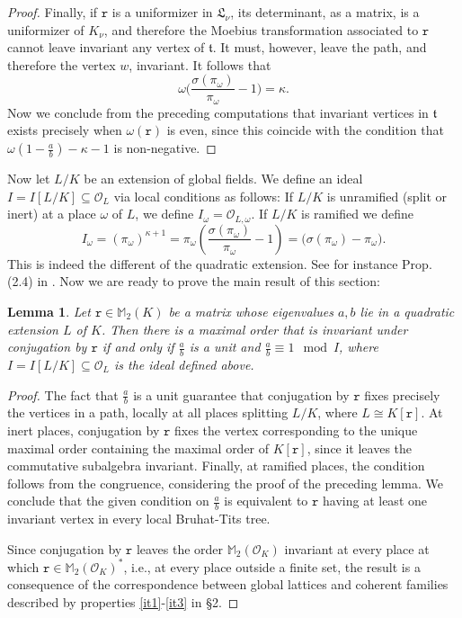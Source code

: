 \documentclass{article}
\newtheorem{Lem}[Prop]{Lemma}
\theoremstyle{definition}
\theoremstyle{remark}
\begin{document}
\begin{proof}
    Finally, if $\mathtt{r}$ is a uniformizer 
    in $\mathfrak{L}_\nu$,
    its determinant, as a matrix, is a uniformizer of $K_\nu$, 
    and therefore the Moebius transformation associated to 
    $\mathtt{r}$ cannot leave invariant any vertex of 
    $\mathfrak{t}$. It must, however, leave the path, and 
    therefore the vertex $w$, invariant. It follows that
    $$\omega\Big(\frac{\sigma(\pi_\omega)}{\pi_\omega}-1\Big)=
    \kappa.$$
    Now we conclude from the preceding computations that
    invariant vertices in $\mathfrak{t}$ exists precisely when
    $\omega(\mathtt{r})$ is even, since this coincide with the 
    condition that $\omega\left(1-\frac ab\right)-\kappa-1$
    is non-negative.
\end{proof}

Now let $L/K$ be an extension of global fields.
We define an ideal $I=I[L/K]\subseteq\mathcal{O}_L$ 
via local conditions as follows:
If $L/K$ is unramified (split or inert) at a place 
$\omega$ of $L$,
we define $I_\omega=\mathcal{O}_{L,\omega}$. 
If $L/K$ is ramified 
we define $$I_\omega=(\pi_\omega)^{\kappa+1}=
\pi_\omega\left(\frac{\sigma(\pi_\omega)}{\pi_\omega}-1\right)
=\big(\sigma(\pi_\omega)-\pi_\omega\big).$$ 
This is indeed the different of the quadratic extension. See
for instance Prop. (2.4) in \cite[\S III.2]{N99}.
Now we are ready to prove the main result of this section:

\begin{Lem}\label{l74}
    Let $\mathtt{r}\in\mathbb{M}_2(K)$ be a matrix whose 
    eigenvalues $a,b$ lie in a quadratic extension $L$ of $K$.
    Then there is a maximal order that is invariant under 
    conjugation by $\mathtt{r}$ if and only if $\frac ab$ 
    is a unit and
    $\frac ab\equiv 1\mod I$, where 
    $I=I[L/K]\subseteq\mathcal{O}_L$ is the ideal 
    defined above.
\end{Lem}

\begin{proof}
    The fact that $\frac ab$ is a unit 
    guarantee that conjugation by $\mathtt{r}$
    fixes precisely the vertices in a path, locally 
    at all places splitting $L/K$, where 
    $L\cong K[\mathtt{r}]$.  At inert places, 
    conjugation by $\mathtt{r}$
    fixes the vertex corresponding to the unique 
    maximal order containing
    the maximal order of $K[\mathtt{r}]$, 
    since it leaves the commutative 
    subalgebra invariant. Finally, at 
    ramified places, the condition
    follows from the congruence, considering the proof of 
    the preceding lemma.
    We conclude that the given condition
    on $\frac ab$ is equivalent to $\mathtt{r}$ having at least
    one invariant vertex in every local Bruhat-Tits tree.

    Since conjugation by $\mathtt{r}$ leaves the order 
    $\mathbb{M}_2(\mathcal{O}_K)$ 
    invariant at every place at which 
    $\mathtt{r}\in\mathbb{M}_2(\mathcal{O}_K)^*$,
    i.e., at every place outside a finite set, the result is 
    a consequence of the
    correspondence between global lattices 
    and coherent families 
    described by properties 
    \ref{it1}-\ref{it3} in \S2.
\end{proof}
\end{document}
